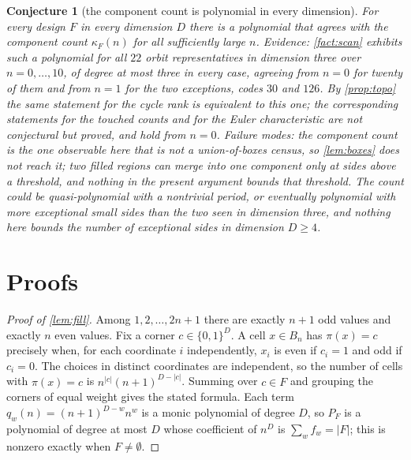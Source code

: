 \documentclass[11pt]{amsart}
\newtheorem{conjecture}[theorem]{Conjecture}
\theoremstyle{definition}
\theoremstyle{remark}
\begin{document}
\begin{conjecture}[the component count is polynomial in every dimension]
\label{con:topo}
For every design $F$ in every dimension $D$ there is a polynomial that agrees with the component count $\kappa_{F}(n)$ for all sufficiently large $n$. \emph{Evidence:} \cref{fact:scan} exhibits such a polynomial for all $22$ orbit representatives in dimension three over $n = 0,\dots,10$, of degree at most three in every case, agreeing from $n=0$ for twenty of them and from $n=1$ for the two exceptions, codes $30$ and $126$. By \cref{prop:topo} the same statement for the cycle rank is equivalent to this one; the corresponding statements for the touched counts and for the Euler characteristic are not conjectural but proved, and hold from $n=0$. \emph{Failure modes:} the component count is the one observable here that is not a union-of-boxes census, so \cref{lem:boxes} does not reach it; two filled regions can merge into one component only at sides above a threshold, and nothing in the present argument bounds that threshold. The count could be quasi-polynomial with a nontrivial period, or eventually polynomial with more exceptional small sides than the two seen in dimension three, and nothing here bounds the number of exceptional sides in dimension $D \ge 4$.
\end{conjecture}

\section{Proofs}
\label{sec:proofs}

\begin{proof}[Proof of \cref{lem:fill}]
Among $1,2,\dots,2n+1$ there are exactly $n+1$ odd values and exactly $n$ even values. Fix a corner $c \in \{0,1\}^{D}$. A cell $x \in B_{n}$ has $\pi(x)=c$ precisely when, for each coordinate $i$ independently, $x_{i}$ is even if $c_{i}=1$ and odd if $c_{i}=0$. The choices in distinct coordinates are independent, so the number of cells with $\pi(x)=c$ is $n^{|c|}(n+1)^{D-|c|}$. Summing over $c \in F$ and grouping the corners of equal weight gives the stated formula. Each term $q_{w}(n)=(n+1)^{D-w}n^{w}$ is a monic polynomial of degree $D$, so $P_{F}$ is a polynomial of degree at most $D$ whose coefficient of $n^{D}$ is $\sum_{w}f_{w}=|F|$; this is nonzero exactly when $F \neq \emptyset$.
\end{proof}
\end{document}
